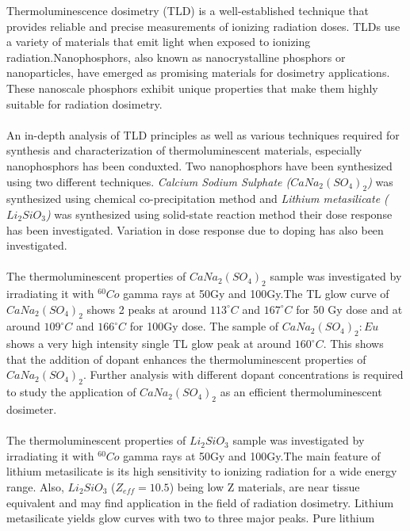\documentclass[../Report.tex]{subfiles}
\begin{document}
    \vspace{1cm}
    \large
    Thermoluminescence dosimetry (TLD) is a well-established technique that provides reliable and precise measurements of ionizing radiation
    doses. TLDs use a variety of materials that emit light when exposed to ionizing radiation.Nanophosphors, also known as 
    nanocrystalline phosphors or nanoparticles, have 
    emerged as promising materials for dosimetry applications. These nanoscale phosphors exhibit unique properties 
    that make them highly suitable for radiation dosimetry.
    \\~\\
    An in-depth analysis of TLD principles as well as various techniques required for synthesis and characterization of thermoluminescent materials, 
    especially nanophosphors has been conduxted. Two nanophosphors have been synthesized using two different techniques.
    \textit{Calcium Sodium Sulphate ($CaNa_2{(SO_4)}_2$)} was synthesized using chemical co-precipitation method and 
    \textit{Lithium metasilicate ($Li_2SiO_3$)} was synthesized using solid-state reaction method their dose response 
    has been investigated. Variation in dose response due to doping has also been investigated.
    \\~\\
    The thermoluminescent properties of $CaNa_2{(SO_4)}_2$ sample was investigated by irradiating it with $^{60}Co$ 
    gamma rays at 50Gy and 100Gy.The TL glow curve of $CaNa_2{(SO_4)}_2$ shows 2 peaks at around $113^{\circ}C$ and $167^{\circ}C$ for 50 Gy
    dose and at around $109^{\circ}C$ and $166^{\circ}C$ for 100Gy dose. The sample of $CaNa_2{(SO_4)}_2:Eu$ shows a
    very high intensity single TL glow peak at around $160^{\circ}C$. This shows that the addition of dopant enhances
    the thermoluminescent properties of $CaNa_2{(SO_4)}_2$. Further analysis with different dopant concentrations is
    required to study the application of $CaNa_2{(SO_4)}_2$ as an efficient thermoluminescent dosimeter.
    \\~\\
    The thermoluminescent properties of $Li_2SiO_3$ sample was investigated by irradiating it with $^{60}Co$ 
    gamma rays at 50Gy and 100Gy.The main feature of lithium metasilicate is its high sensitivity to ionizing radiation for a wide energy range. 
    Also, $Li_2SiO_3$ ($Z_{eff} = 10.5$) being low Z materials, are near tissue equivalent and may find application in the field of 
    radiation dosimetry. Lithium metasilicate yields glow curves with two to three major peaks. Pure lithium 
\end{document}
